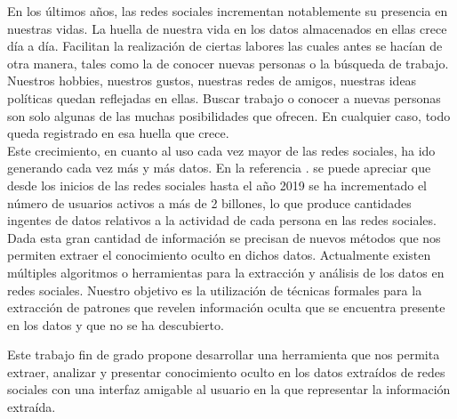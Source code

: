 \documentclass[../../main.tex]{subfiles}
\begin{document}
En los últimos años, las redes sociales incrementan notablemente su presencia en nuestras vidas. La huella de nuestra vida en los datos almacenados en ellas crece día a día. Facilitan la realización de ciertas labores las cuales antes se hacían de otra manera, tales como la de conocer nuevas personas o la búsqueda de trabajo. Nuestros hobbies, nuestros gustos, nuestras redes de amigos, nuestras ideas políticas quedan reflejadas en ellas. Buscar trabajo o conocer a nuevas personas son solo algunas de las muchas posibilidades que ofrecen. En cualquier caso, todo queda registrado en esa huella que crece. \\

Este crecimiento, en cuanto al uso cada vez mayor de las redes sociales, ha ido generando cada vez más y más datos. En la referencia \cite{risesn}. se puede apreciar que desde los inicios de las redes sociales hasta el año 2019 se ha incrementado el número de usuarios activos a más de 2 billones, lo que produce cantidades ingentes de datos relativos a la actividad de cada persona en las redes sociales. \\

Dada esta gran cantidad de información se precisan de nuevos métodos que nos permiten extraer el conocimiento oculto en dichos datos. Actualmente existen múltiples algoritmos o herramientas para la extracción y análisis de los datos en redes sociales. Nuestro objetivo es la utilización de técnicas formales para la extracción de patrones que revelen información oculta que se encuentra presente en los datos y que no se ha descubierto. \\ \newline\newline

Este trabajo fin de grado propone desarrollar una herramienta que nos permita extraer, analizar y presentar conocimiento oculto en los datos extraídos de redes sociales con  una interfaz amigable al usuario en la que representar la información extraída. 
\end{document}
